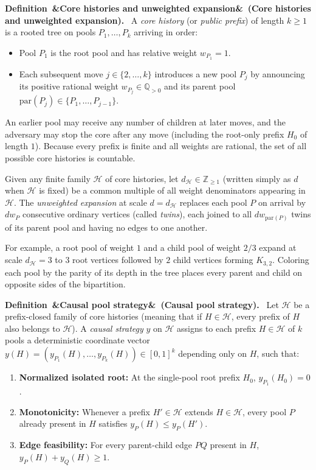 \documentclass[11pt,letterpaper]{article}
\newenvironment{definition}[1][]{\refstepcounter{lemma}\par\medskip\noindent\textbf{Definition~\thelemma\ifx&#1&\else\ (#1)\fi.}\ \ignorespaces}{\par\medskip}
\begin{document}
\begin{definition}[Core histories and unweighted expansion]\label{def:core}
A \emph{core history} (or \emph{public prefix}) of length $k\ge 1$ is a rooted tree on pools $P_1,\ldots,P_k$ arriving in order:
\begin{itemize}
\item Pool $P_1$ is the root pool and has relative weight $w_{P_1}=1$.
\item Each subsequent move $j\in\{2,\ldots,k\}$ introduces a new pool $P_j$ by announcing its positive rational weight $w_{P_j}\in\mathbb Q_{>0}$ and its parent pool $\mathrm{par}(P_j)\in\{P_1,\ldots,P_{j-1}\}$.
\end{itemize}
An earlier pool may receive any number of children at later moves, and the adversary may stop the core after any move (including the root-only prefix $H_0$ of length $1$). Because every prefix is finite and all weights are rational, the set of all possible core histories is countable.

Given any finite family $\mathcal H$ of core histories, let $d_{\mathcal H}\in\mathbb Z_{\ge 1}$ (written simply as $d$ when $\mathcal H$ is fixed) be a common multiple of all weight denominators appearing in $\mathcal H$. The \emph{unweighted expansion} at scale $d=d_{\mathcal H}$ replaces each pool $P$ on arrival by $d w_P$ consecutive ordinary vertices (called \emph{twins}), each joined to all $d w_{\mathrm{par}(P)}$ twins of its parent pool and having no edges to one another.
\end{definition}

For example, a root pool of weight $1$ and a child pool of weight $2/3$ expand at scale $d_{\mathcal H}=3$ to $3$ root vertices followed by $2$ child vertices forming $K_{3,2}$. Coloring each pool by the parity of its depth in the tree places every parent and child on opposite sides of the bipartition.

\begin{definition}[Causal pool strategy]\label{def:strategy}
Let $\mathcal H$ be a prefix-closed family of core histories (meaning that if $H\in\mathcal H$, every prefix of $H$ also belongs to $\mathcal H$). A \emph{causal strategy} $y$ on $\mathcal H$ assigns to each prefix $H\in\mathcal H$ of $k$ pools a deterministic coordinate vector $y(H)=(y_{P_1}(H),\ldots,y_{P_k}(H))\in[0,1]^k$ depending only on $H$, such that:
\begin{enumerate}
\item \textbf{Normalized isolated root:} At the single-pool root prefix $H_0$, $y_{P_1}(H_0)=0$.
\item \textbf{Monotonicity:} Whenever a prefix $H'\in\mathcal H$ extends $H\in\mathcal H$, every pool $P$ already present in $H$ satisfies $y_P(H)\le y_P(H')$.
\item \textbf{Edge feasibility:} For every parent-child edge $PQ$ present in $H$, $y_P(H)+y_Q(H)\ge 1$.
\end{enumerate}
\end{definition}
\end{document}
